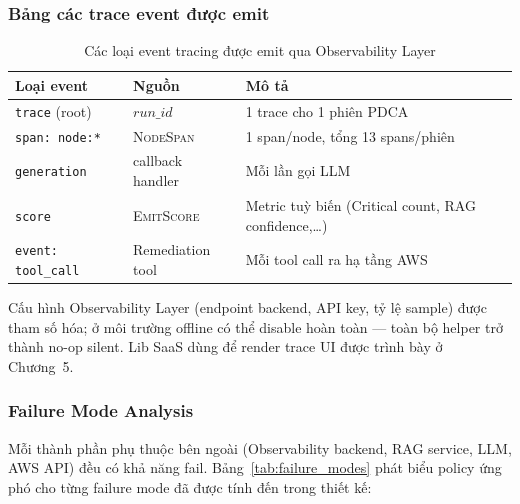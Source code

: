 \subsubsection*{Bảng các trace event được emit}
\begin{table}[!htb]
  \centering
  \caption{Các loại event tracing được emit qua Observability Layer}
  \label{tab:langfuse_events}
  \begin{tabular}{|l|l|p{6.5cm}|}
    \hline
    \textbf{Loại event} & \textbf{Nguồn} & \textbf{Mô tả} \\ \hline
    \texttt{trace} (root) & $run\_id$ & 1 trace cho 1 phiên PDCA \\ \hline
    \texttt{span: node:*} & \textsc{NodeSpan} & 1 span/node, tổng 13 spans/phiên \\ \hline
    \texttt{generation} & callback handler & Mỗi lần gọi LLM \\ \hline
    \texttt{score} & \textsc{EmitScore} & Metric tuỳ biến (Critical count, RAG confidence,\ldots) \\ \hline
    \texttt{event: tool\_call} & Remediation tool & Mỗi tool call ra hạ tầng AWS \\ \hline
  \end{tabular}
\end{table}

Cấu hình Observability Layer (endpoint backend, API key, tỷ lệ sample) được tham số hóa; ở môi trường offline có thể disable hoàn toàn — toàn bộ helper trở thành no-op silent. Lib SaaS dùng để render trace UI được trình bày ở Chương~5.

\subsubsection*{Failure Mode Analysis}
\label{sec:failure_modes}

Mỗi thành phần phụ thuộc bên ngoài (Observability backend, RAG service, LLM, AWS API) đều có khả năng fail. Bảng~\ref{tab:failure_modes} phát biểu policy ứng phó cho từng failure mode đã được tính đến trong thiết kế:

